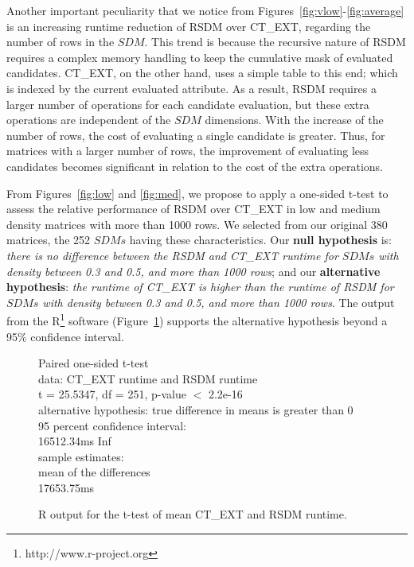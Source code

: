 \documentclass[authoryear,11pt]{elsarticle}
\begin{document}
	Another important peculiarity that we notice from Figures~\ref{fig:vlow}-\ref{fig:average} is an increasing
	runtime reduction of RSDM over CT\_EXT, regarding the number of rows in the $SDM$. This trend is because the 
	recursive nature of RSDM requires a complex memory handling to keep the cumulative mask of evaluated candidates. 
	CT\_EXT, on the other hand, uses a simple table to this end; which is indexed by the current evaluated
	attribute. As a result, RSDM requires a larger number of operations for each candidate evaluation, but these 
	extra operations are independent of the $SDM$ dimensions. With the increase of the number of rows, the cost of 
	evaluating a single candidate is greater. Thus, for matrices with a larger number of rows, the improvement of 
	evaluating less candidates becomes significant in relation to the cost of the extra operations.	
	
	From Figures~\ref{fig:low} and \ref{fig:med}, we propose to apply a one-sided t-test to assess the relative 
	performance of RSDM over CT\_EXT in low and medium density matrices with more than 1000 rows. We selected from 
	our original 380 matrices, the 252 $SDMs$ having these characteristics. Our \textbf{null hypothesis} is: 
	\emph{there is no difference between the RSDM and CT\_EXT runtime for $SDMs$ with density between 0.3 and 0.5, 
	and more than 1000 rows}; and our \textbf{alternative hypothesis}: \emph{the runtime of CT\_EXT is higher than 
	the runtime of RSDM for $SDMs$ with density between 0.3 and 0.5, and more than 1000 rows}. The output from the 
	R\footnote{http://www.r-project.org} software (Figure~\ref{fig:R_RSDM}) supports the alternative hypothesis 
	beyond a 95\% confidence interval.
	
	\begin{figure}
		\qquad{}	Paired one-sided t-test\\

		data:  CT\_EXT runtime and RSDM runtime\\
		t = 25.5347, df = 251, p-value $<$ 2.2e-16\\
		alternative hypothesis: true difference in means is greater than 0\\
		95 percent confidence interval:\\
		 16512.34ms  \qquad{}  Inf\\
		sample estimates:\\
		mean of the differences \\
		 \qquad{}    17653.75ms
		
		\centering
	  	\caption{R output for the t-test of mean CT\_EXT and RSDM runtime.}
	  	\label{fig:R_RSDM}
	\end{figure}
	
\end{document}
